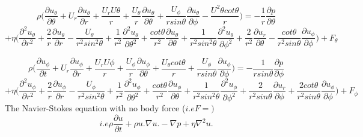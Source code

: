 \documentclass[a4paper, 12pt]{report}
\begin{document}
\begin{equation*} 
	\rho\bigg(\frac{\partial u_\theta}{\partial \theta}+U_r\frac{\partial u_\theta}{\partial r}+\frac{U_rU\theta}{r}+\frac{U_\theta}{r}\frac{\partial u_\theta}{\partial \theta}+\frac{U_\phi}{rsin\theta}\frac{\partial u_\theta}{\partial \phi}-\frac{U^2\theta cot\theta}{r}\bigg)=-\frac{1}{r}\frac{\partial p}{\partial \theta}
\end{equation*}
\begin{equation*} 
	+\eta\bigg(\frac{\partial^2 u_\theta}{\partial r^2}+\frac{2}{r}\frac{\partial u_\theta}{\partial r}-\frac{U_\theta}{r^2sin^2\theta}+\frac{1}{r^2}\frac{\partial^2 u_\theta}{\partial \theta^2}+\frac{cot\theta}{r^2}\frac{\partial u_\theta}{\partial \theta}+\frac{1}{r^2sin^2\theta}\frac{\partial^2 u_\theta}{\partial \phi^2}+\frac{2}{r^2}\frac{\partial u_r}{\partial \theta}-\frac{cot\theta}{r^2sin\theta}\frac{\partial u_\phi}{\partial\phi}\bigg)+F_\theta
\end{equation*}

\begin{equation*} 
	\rho\bigg(\frac{\partial u_\phi}{\partial t}+U_r\frac{\partial u_\phi}{\partial r}+\frac{U_rU\phi}{r}+\frac{U_\phi}{r}\frac{\partial u_\phi}{\partial \theta}+\frac{U_\theta cot\theta}{r}+\frac{U_\phi}{rsin\theta}\frac{\partial u_\phi}{\partial \phi}\bigg)=-\frac{1}{rsin\theta}\frac{\partial p}{\partial \phi}
\end{equation*}
\begin{equation*} 
	+\eta\bigg(\frac{\partial^2 u_\phi}{\partial r^2}+\frac{2}{r}\frac{\partial u_\phi}{\partial r}-\frac{U_\phi}{r^2sin^2\theta}+\frac{1}{r^2}\frac{\partial^2 u_\phi}{\partial \theta^2}+\frac{cot\theta}{r^2}\frac{\partial u_\phi}{\partial \theta}+\frac{1}{r^2sin^2\theta}\frac{\partial^2 u_\phi}{\partial \phi^2}+\frac{2}{r^2sin\theta}\frac{\partial u_r}{\partial \phi}+\frac{2cot\theta}{r^2sin\theta}\frac{\partial u_\phi}{\partial\phi}\bigg)+F_\phi
\end{equation*}
The Navier-Stokes equation with no body force ($i.e F=)$ 
\begin{equation*} 
	i.e \rho\frac{\partial u}{\partial t}+\rho u.\nabla u.-\nabla p+\eta\nabla^2u.
\end{equation*}
\end{document}
